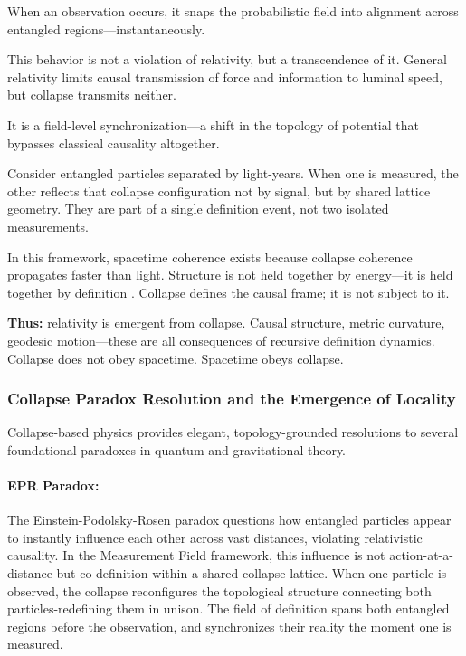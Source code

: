 When an observation occurs, it snaps the probabilistic field into alignment across entangled regions---instantaneously.

This behavior is not a violation of relativity, but a transcendence of it. General relativity limits causal transmission of force and information to luminal speed, but collapse transmits neither. 

It is a field-level synchronization---a shift in the topology of potential that bypasses classical causality altogether.

Consider entangled particles separated by light-years. When one is measured, the other reflects that collapse configuration not by signal, but by shared lattice geometry. They are part of a single definition event, not two isolated measurements.

In this framework, spacetime coherence exists because collapse coherence propagates faster than light. Structure is not held together by energy---it is held together by  definition . Collapse defines the causal frame; it is not subject to it.

\textbf{Thus:} relativity is emergent from collapse. Causal structure, metric curvature, geodesic motion---these are all consequences of recursive definition dynamics. Collapse does not obey spacetime. Spacetime obeys collapse. \cite{emergent_field_core, entanglement_structure, quantum_thermo_laws, thermalization_dynamics, blackhole_collapse_links}

\subsubsection{Collapse Paradox Resolution and the Emergence of Locality} \cite{emergent_field_core, entanglement_structure, quantum_thermo_laws, thermalization_dynamics, blackhole_collapse_links}

Collapse-based physics provides elegant, topology-grounded resolutions to several foundational paradoxes in quantum and gravitational theory.

\paragraph{EPR Paradox:} \cite{emergent_field_core, entanglement_structure, quantum_thermo_laws, thermalization_dynamics, blackhole_collapse_links}
The Einstein-Podolsky-Rosen paradox questions how entangled particles appear to instantly influence each other across vast distances, violating relativistic causality. In the Measurement Field framework, this influence is not action-at-a-distance but  co-definition  within a shared collapse lattice. When one particle is observed, the collapse reconfigures the topological structure connecting both particles-redefining them in unison. The field of definition spans both entangled regions before the observation, and synchronizes their reality the moment one is measured.

